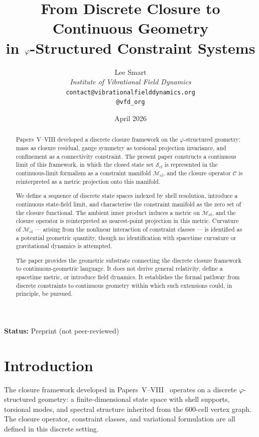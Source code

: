 \documentclass[12pt]{article}
\title{From Discrete Closure to Continuous Geometry\\in $\phig$-Structured Constraint Systems}
\author{%
  Lee Smart\\[4pt]
  \textit{Institute of Vibrational Field Dynamics}\\[2pt]
  \texttt{contact@vibrationalfielddynamics.org}\\[2pt]
  \texttt{@vfd\_org}%
}
\date{April 2026}
\newcommand{\Mcl}{\mathcal{M}_{\mathrm{cl}}}
\newcommand{\Ccal}{\mathcal{C}}
\newcommand{\Scl}{\mathcal{S}_{\mathrm{cl}}}
\newcommand{\phig}{\varphi}
\begin{document}
\maketitle

\noindent\textbf{Status:} Preprint (not peer-reviewed)

\begin{abstract}
Papers~V--VIII developed a discrete closure framework on the $\phig$-structured geometry: mass as closure residual, gauge symmetry as torsional projection invariance, and confinement as a connectivity constraint. The present paper constructs a continuous limit of this framework, in which the closed state set $\Scl$ is represented in the continuous-limit formalism as a constraint manifold $\Mcl$, and the closure operator $\Ccal$ is reinterpreted as a metric projection onto this manifold.

We define a sequence of discrete state spaces indexed by shell resolution, introduce a continuous state-field limit, and characterise the constraint manifold as the zero set of the closure functional. The ambient inner product induces a metric on $\Mcl$, and the closure operator is reinterpreted as nearest-point projection in this metric. Curvature of $\Mcl$ --- arising from the nonlinear interaction of constraint classes --- is identified as a potential geometric quantity, though no identification with spacetime curvature or gravitational dynamics is attempted.

The paper provides the geometric substrate connecting the discrete closure framework to continuous-geometric language. It does not derive general relativity, define a spacetime metric, or introduce field dynamics. It establishes the formal pathway from discrete constraints to continuous geometry within which such extensions could, in principle, be pursued.
\end{abstract}

\section{Introduction}\label{sec:intro}

The closure framework developed in Papers~V--VIII~\citep{SmartV, SmartVII, SmartVIII} operates on a discrete $\phig$-structured geometry: a finite-dimensional state space with shell supports, torsional modes, and spectral structure inherited from the 600-cell vertex graph. The closure operator, constraint classes, and variational formulation are all defined in this discrete setting.
\end{document}
